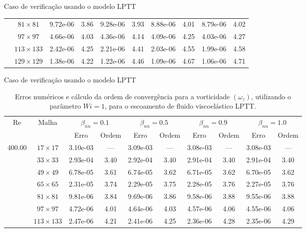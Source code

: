 \begin{frame}{Caso de verificação usando o modelo LPTT}
\begin{table}[H]
{\begin{tabular*}{\textwidth}{@{\extracolsep\fill}cccccccccc@{}}
    & $81\times 81$ & 9.72e-06 & 3.86 & 9.28e-06 & 3.93 & 8.88e-06 & 4.01 & 8.79e-06 & 4.02 \\
    & $97\times 97$ & 4.66e-06 & 4.03 & 4.36e-06 & 4.14 & 4.09e-06 & 4.25 & 4.03e-06 & 4.27 \\
    & $113\times 133$ & 2.42e-06 & 4.25 & 2.21e-06 & 4.41 & 2.03e-06 & 4.55 & 1.99e-06 & 4.58 \\
    & $129\times 129$ & 1.38e-06 & 4.22 & 1.22e-06 & 4.46 & 1.09e-06 & 4.67 & 1.06e-06 & 4.71 \\
    \hline
    \end{tabular*}
}
\end{table}
\end{frame}


\begin{frame}{Caso de verificação usando o modelo LPTT}
    \centering
    \begin{table}[H]
\caption{Erros numéricos e cálculo da ordem de convergência para a vorticidade $(\omega_{z})$, utilizando o parâmetro $Wi=1$, para o escoamento de fluido viscoelástico LPTT.\label{tab_LPTTWzResumida_1}}
\scriptsize{
    \begin{tabular*}{\textwidth}{@{\extracolsep\fill}cccccccccc@{}}
    \hline
    \multirow{2}{*}{$\operatorname{Re}$} & \multirow{2}{*}{Malha} & \multicolumn{2}{c}{$\beta_{nn}=0.1$}  & \multicolumn{2}{c}{$\beta_{nn}=0.5$}  & \multicolumn{2}{c}{$\beta_{nn}=0.9$}  & \multicolumn{2}{c}{$\beta_{nn}=1.0$}\\ %
     & & Erro & Ordem & Erro & Ordem & Erro & Ordem & Erro & Ordem \\
    \hline
    \multirow{10}{*}{400.00} & $17\times 17$ & 3.10e-03 & --- & 3.09e-03 & --- & 3.08e-03 & --- & 3.08e-03 & --- \\
    & $33\times 33$ & 2.93e-04 & 3.40 & 2.92e-04 & 3.40 & 2.91e-04 & 3.40 & 2.91e-04 & 3.40 \\
    & $49\times 49$ & 6.78e-05 & 3.61 & 6.74e-05 & 3.62 & 6.71e-05 & 3.62 & 6.70e-05 & 3.62 \\
    & $65\times 65$ & 2.31e-05 & 3.74 & 2.29e-05 & 3.75 & 2.28e-05 & 3.76 & 2.27e-05 & 3.76 \\
    & $81\times 81$ & 9.81e-06 & 3.84 & 9.69e-06 & 3.86 & 9.58e-06 & 3.88 & 9.55e-06 & 3.88 \\
    & $97\times 97$ & 4.72e-06 & 4.01 & 4.64e-06 & 4.03 & 4.57e-06 & 4.06 & 4.55e-06 & 4.06 \\
    & $113\times 133$ & 2.47e-06 & 4.21 & 2.41e-06 & 4.25 & 2.36e-06 & 4.28 & 2.35e-06 & 4.29 \\

\end{tabular*}}
\end{table}
\end{frame}
